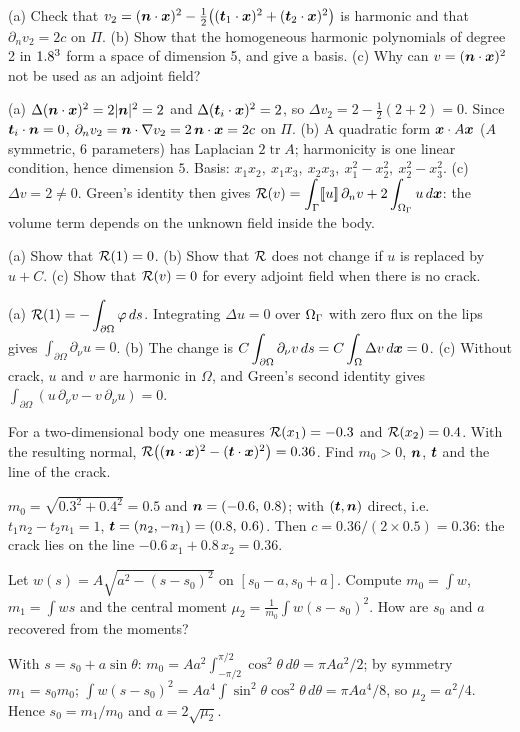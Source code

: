 (a) Check that $v_2=(\bm{n}\cdot\bm{x})^2-\tfrac12\bigl((\bm{t}_1\cdot\bm{x})^2+(\bm{t}_2\cdot\bm{x})^2\bigr)$ is harmonic and that $\partial_nv_2=2c$ on $\Pi$.
(b) Show that the homogeneous harmonic polynomials of degree 2 in $1.8^3$ form a space of dimension 5, and give a basis.
(c) Why can $v=(\bm{n}\cdot\bm{x})^2$ not be used as an adjoint field?
\begin{solution}
(a) $\Delta(\bm{n}\cdot\bm{x})^2=2|\bm{n}|^2=2$ and $\Delta(\bm{t}_i\cdot\bm{x})^2=2$, so $\Delta v_2=2-\tfrac12(2+2)=0$. Since $\bm{t}_i\cdot\bm{n}=0$, $\partial_nv_2=\bm{n}\cdot\nabla v_2=2\,\bm{n}\cdot\bm{x}=2c$ on $\Pi$.
(b) A quadratic form $\bm{x}\cdot A\bm{x}$ ($A$ symmetric, 6 parameters) has Laplacian $2\operatorname{tr}A$; harmonicity is one linear condition, hence dimension $5$. Basis: $x_1x_2,\ x_1x_3,\ x_2x_3,\ x_1^2-x_2^2,\ x_2^2-x_3^2$.
(c) $\Delta v=2\neq0$. Green's identity then gives $\displaystyle \mathcal{R}(v)=\int_\Gamma[\![u]\!]\,\partial_nv+2\int_{\Omega_\Gamma}u\,d\bm{x}$: the volume term depends on the unknown field inside the body.
\end{solution}

\label{exo:rg-invariances}
(a) Show that $\mathcal{R}(1)=0$. (b) Show that $\mathcal{R}$ does not change if $u$ is replaced by $u+C$. (c) Show that $\mathcal{R}(v)=0$ for every adjoint field when there is no crack.
\begin{solution}
(a) $\displaystyle \mathcal{R}(1)=-\int_{\partial\Omega}\varphi\,ds$. Integrating $\Delta u=0$ over $\Omega_\Gamma$ with zero flux on the lips gives $\displaystyle \int_{\partial\Omega}\partial_\nu u=0$.
(b) The change is $\displaystyle C\int_{\partial\Omega}\partial_\nu v\,ds=C\int_\Omega\Delta v\,d\bm{x}=0$.
(c) Without crack, $u$ and $v$ are harmonic in $\Omega$, and Green's second identity gives $\displaystyle \int_{\partial\Omega}(u\,\partial_\nu v-v\,\partial_\nu u)=0$.
\end{solution}

For a two-dimensional body one measures $\mathcal{R}(x_1)=-0.3$ and $\mathcal{R}(x_2)=0.4$. With the resulting normal, $\mathcal{R}\bigl((\bm{n}\cdot\bm{x})^2-(\bm{t}\cdot\bm{x})^2\bigr)=0.36$. Find $m_0>0$, $\bm{n}$, $\bm{t}$ and the line of the crack.
\begin{solution}
$m_0=\sqrt{0.3^2+0.4^2}=0.5$ and $\bm{n}=(-0.6,\,0.8)$; with $(\bm{t},\bm{n})$ direct, i.e.\ $t_1n_2-t_2n_1=1$, $\bm{t}=(n_2,-n_1)=(0.8,\,0.6)$. Then $c=0.36/(2\times0.5)=0.36$: the crack lies on the line $-0.6\,x_1+0.8\,x_2=0.36$.
\end{solution}

Let $w(s)=A\sqrt{a^2-(s-s_0)^2}$ on $[s_0-a,s_0+a]$. Compute $\displaystyle m_0=\int w$, $\displaystyle m_1=\int ws$ and the central moment $\displaystyle \mu_2=\frac1{m_0}\int w(s-s_0)^2$. How are $s_0$ and $a$ recovered from the moments?
\begin{solution}
With $s=s_0+a\sin\theta$: $\displaystyle m_0=Aa^2\int_{-\pi/2}^{\pi/2}\cos^2\theta\,d\theta=\pi Aa^2/2$; by symmetry $m_1=s_0m_0$; $\displaystyle \int w(s-s_0)^2=Aa^4\int\sin^2\theta\cos^2\theta\,d\theta=\pi Aa^4/8$, so $\mu_2=a^2/4$. Hence $s_0=m_1/m_0$ and $a=2\sqrt{\mu_2}$.
\end{solution}

